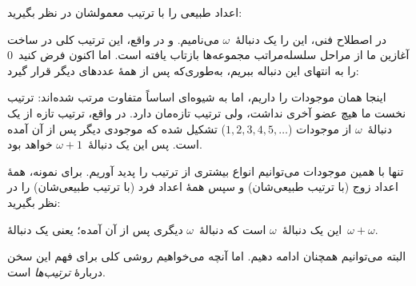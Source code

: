 \documentclass[../../../include/open-logic-section]{subfiles}
\begin{document}

اعداد طبیعی را با ترتیب معمولشان در نظر بگیرید:
\begin{center}
\end{center}
در اصطلاح فنی، این را یک دنبالهٔ~$\omega$ می‌نامیم. و در واقع، این ترتیب
کلی در ساخت آغازین ما از مراحل سلسله‌مراتب مجموعه‌ها بازتاب یافته است.
اما اکنون فرض کنید~$0$ را به انتهای این دنباله ببریم، به‌طوری‌که پس از
همهٔ عددهای دیگر قرار گیرد:
\begin{center}
\end{center}
اینجا همان موجودات را داریم، اما به شیوه‌ای اساساً متفاوت مرتب شده‌اند:
ترتیب نخست ما هیچ عضو آخری نداشت، ولی ترتیب تازه‌مان دارد. در واقع، ترتیب
تازه از یک دنبالهٔ~$\omega$ از موجودات
($1,2,3,4,5,\ldots$) تشکیل شده که موجودی دیگر پس از آن آمده است. پس این
یک دنبالهٔ~$\omega+1$ خواهد بود.

تنها با همین موجودات می‌توانیم انواع بیشتری از ترتیب را پدید آوریم. برای
نمونه، همهٔ اعداد زوج (با ترتیب طبیعی‌شان) و سپس همهٔ اعداد فرد (با ترتیب
طبیعی‌شان) را در نظر بگیرید:
\begin{center}
\end{center}
این یک دنبالهٔ~$\omega$ است که دنبالهٔ~$\omega$ دیگری پس از آن آمده؛ یعنی
یک دنبالهٔ~$\omega+\omega$.

البته می‌توانیم همچنان ادامه دهیم. اما آنچه می‌خواهیم روشی کلی برای فهم
این سخن دربارهٔ \emph{ترتیب‌ها} است.
\end{document}
